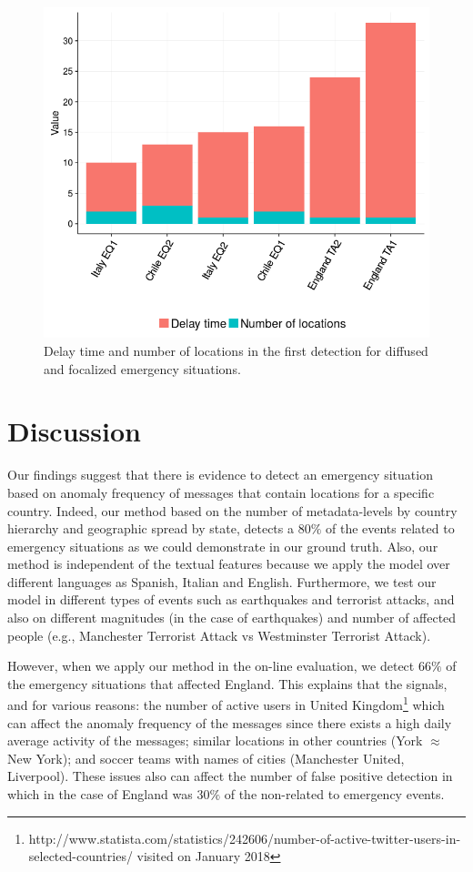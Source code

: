 \documentclass[sigconf]{acmart}
\begin{document}
\begin{figure}
	\centering
	\includegraphics[width=\columnwidth]{img/delay.png}
	\caption{Delay time and number of locations in the first detection for diffused and focalized emergency situations.}
	\label{fig:delay}
\end{figure}

\section{Discussion}

Our findings suggest that there is evidence to detect an emergency situation based on anomaly frequency of messages that contain locations for a specific country. Indeed, our method based on the number of metadata-levels by country hierarchy and geographic spread by state, detects a $80\%$ of the events related to emergency situations as we could demonstrate in our ground truth. Also, our method is independent of the textual features because we apply the model over different languages as Spanish, Italian and English. Furthermore, we test our model in different types of events such as earthquakes and terrorist attacks, and also on different magnitudes (in the case of earthquakes) and number of affected people (e.g., Manchester Terrorist Attack vs Westminster Terrorist Attack).

However, when we apply our method in the on-line evaluation, we detect $66\%$ of the emergency situations that affected England. This explains that the signals, and for various reasons: the number of active users in United Kingdom\footnote{http://www.statista.com/statistics/242606/number-of-active-twitter-users-in-selected-countries/ visited on January 2018} which can affect the anomaly frequency of the messages since there exists a high daily average activity of the messages; similar locations in other countries (York $\approx$ New York); and soccer teams with names of cities (Manchester United, Liverpool). These issues also can affect the number of false positive detection in which in the case of England was $30\%$ of the non-related to emergency events.
\end{document}

